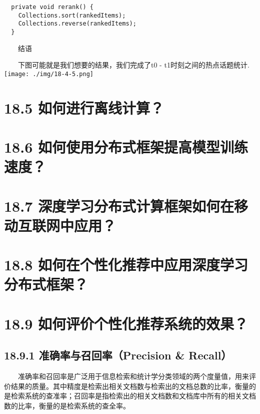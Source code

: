 \begin{verbatim}
  private void rerank() {
    Collections.sort(rankedItems);
    Collections.reverse(rankedItems);
  }
\end{verbatim}

  结语

  下图可能就是我们想要的结果，我们完成了t0 - t1时刻之间的热点话题统计.
\texttt{[image: ./img/18-4-5.png]}

\section{18.5
如何进行离线计算？}\label{ux5982ux4f55ux8fdbux884cux79bbux7ebfux8ba1ux7b97}

\section{18.6
如何使用分布式框架提高模型训练速度？}\label{ux5982ux4f55ux4f7fux7528ux5206ux5e03ux5f0fux6846ux67b6ux63d0ux9ad8ux6a21ux578bux8badux7ec3ux901fux5ea6}

\section{18.7
深度学习分布式计算框架如何在移动互联网中应用？}\label{ux6df1ux5ea6ux5b66ux4e60ux5206ux5e03ux5f0fux8ba1ux7b97ux6846ux67b6ux5982ux4f55ux5728ux79fbux52a8ux4e92ux8054ux7f51ux4e2dux5e94ux7528}

\section{18.8
如何在个性化推荐中应用深度学习分布式框架？}\label{ux5982ux4f55ux5728ux4e2aux6027ux5316ux63a8ux8350ux4e2dux5e94ux7528ux6df1ux5ea6ux5b66ux4e60ux5206ux5e03ux5f0fux6846ux67b6}

\section{18.9
如何评价个性化推荐系统的效果？}\label{ux5982ux4f55ux8bc4ux4ef7ux4e2aux6027ux5316ux63a8ux8350ux7cfbux7edfux7684ux6548ux679c}

\subsection{18.9.1 准确率与召回率（Precision \&
Recall）}\label{ux51c6ux786eux7387ux4e0eux53ecux56deux7387precision-recall}

  准确率和召回率是广泛用于信息检索和统计学分类领域的两个度量值，用来评价结果的质量。其中精度是检索出相关文档数与检索出的文档总数的比率，衡量的是检索系统的查准率；召回率是指检索出的相关文档数和文档库中所有的相关文档数的比率，衡量的是检索系统的查全率。

